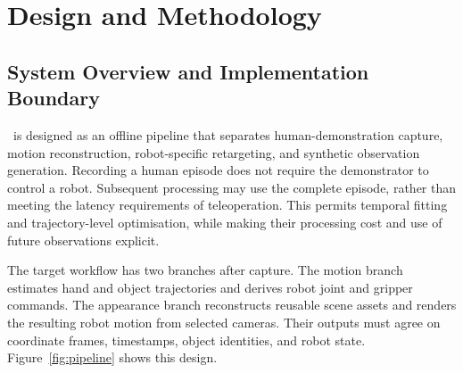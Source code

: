 
\chapter{Design and Methodology}
\label{ch:method}

\section{System Overview and Implementation Boundary}
\label{sec:overview}

\viki\ is designed as an offline pipeline that separates human-demonstration
capture, motion reconstruction, robot-specific retargeting, and synthetic
observation generation. Recording a human episode does not require the
demonstrator to control a robot. Subsequent processing may use the complete
episode, rather than meeting the latency requirements of teleoperation.
This permits temporal fitting and trajectory-level optimisation, while making
their processing cost and use of future observations explicit.

The target workflow has two branches after capture. The motion branch
estimates hand and object trajectories and derives robot joint and gripper
commands. The appearance branch reconstructs reusable scene assets and
renders the resulting robot motion from selected cameras. Their outputs
must agree on coordinate frames, timestamps, object identities, and robot
state. Figure~\ref{fig:pipeline} shows this design.

